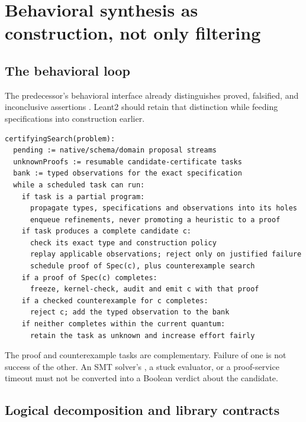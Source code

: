 \section{Behavioral synthesis as construction, not only filtering}
\label{sec:behavior}

\subsection{The behavioral loop}

The predecessor's behavioral interface already distinguishes proved, falsified, and inconclusive assertions \cite{leant-behavior}. Leant2 should retain that distinction while feeding specifications into construction earlier.

\par\noindent\begin{minipage}{\linewidth}
\begin{lstlisting}[language={}]
certifyingSearch(problem):
  pending := native/schema/domain proposal streams
  unknownProofs := resumable candidate-certificate tasks
  bank := typed observations for the exact specification
  while a scheduled task can run:
    if task is a partial program:
      propagate types, specifications and observations into its holes
      enqueue refinements, never promoting a heuristic to a proof
    if task produces a complete candidate c:
      check its exact type and construction policy
      replay applicable observations; reject only on justified failure
      schedule proof of Spec(c), plus counterexample search
    if a proof of Spec(c) completes:
      freeze, kernel-check, audit and emit c with that proof
    if a checked counterexample for c completes:
      reject c; add the typed observation to the bank
    if neither completes within the current quantum:
      retain the task as unknown and increase effort fairly
\end{lstlisting}
\end{minipage}\par

The proof and counterexample tasks are complementary. Failure of one is not success of the other. An SMT solver's , a stuck evaluator, or a proof-service timeout must not be converted into a Boolean verdict about the candidate.

\subsection{Logical decomposition and library contracts}

